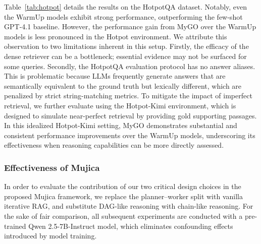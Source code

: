 Table~\ref{tab:hotpot} details the results on the HotpotQA dataset.
Notably, even the WarmUp models exhibit strong performance, outperforming the few-shot GPT-4.1 baseline.
However, the performance gain from MyGO over the WarmUp models is less pronounced in the Hotpot environment.
We attribute this observation to two limitations inherent in this setup.
Firstly, the efficacy of the dense retriever can be a bottleneck;
essential evidence may not be surfaced for some queries.
Secondly, the HotpotQA evaluation protocol has no answer aliases.
This is problematic because LLMs frequently generate answers that are semantically equivalent to the ground truth but lexically different, which are penalized by strict string-matching metrics.
To mitigate the impact of imperfect retrieval, we further evaluate using the Hotpot-Kimi environment, which is designed to simulate near-perfect retrieval by providing gold supporting passages.
In this idealized Hotpot-Kimi setting, MyGO demonstrates substantial and consistent performance improvements over the WarmUp models, underscoring its effectiveness when reasoning capabilities can be more directly assessed.

\subsubsection{\textbf{Effectiveness of Mujica}}
In order to evaluate the contribution of our two critical design choices in the proposed Mujica framework, we replace the planner–worker split with vanilla iterative RAG, and substitute DAG-like reasoning with chain-like reasoning. For the sake of fair comparison, all subsequent experiments are conducted with a pre-trained Qwen 2.5-7B-Instruct model, which eliminates confounding effects introduced by model training.

